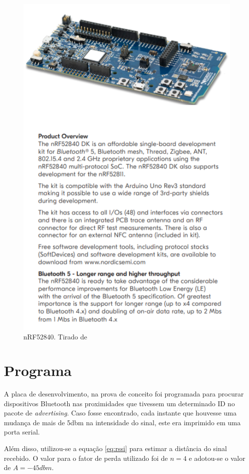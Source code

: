 \begin{figure}[H]
	\centering
	\includegraphics[scale = 1]{images/nRF52840_dk.png}
	\caption{nRF52840. Tirado de \cite{nRF52840_site}}
	\label{fig:nRF52840_dk}
\end{figure}


\section{Programa}
A placa de desenvolvimento, na prova de conceito foi programada para procurar dispositivos Bluetooth nas proximidades que tivessem um determinado ID no pacote de \textit{advertising}. Caso fosse encontrado, cada instante que houvesse uma mudança de mais de 5dbm na intensidade do sinal, este era imprimido em uma porta serial.

Além disso, utilizou-se a equação \ref{eq:rssi} para estimar a distância do sinal recebido. O valor para o fator de perda utilizado foi de \(n = 4\) e adotou-se o valor de \(A = -45dbm\).

